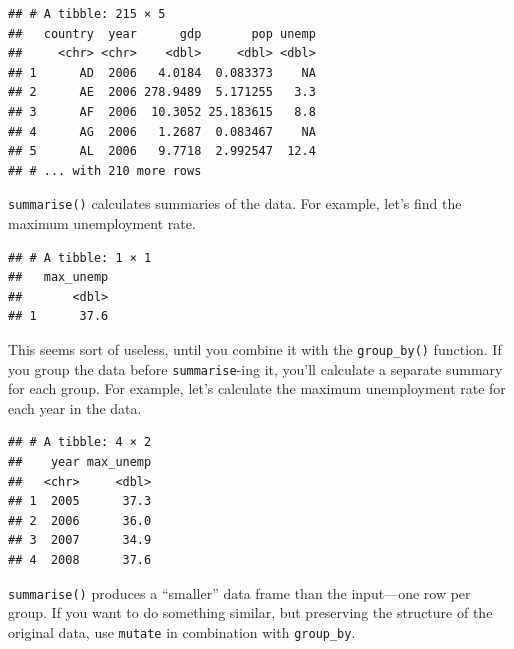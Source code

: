 \documentclass[12pt,oneside,openany]{book}
\newenvironment{Shaded}{\begin{snugshade}}{\end{snugshade}}
\newcommand{\KeywordTok}[1]{\textcolor[rgb]{0.13,0.29,0.53}{\textbf{{#1}}}}
\newcommand{\DataTypeTok}[1]{\textcolor[rgb]{0.13,0.29,0.53}{{#1}}}
\newcommand{\StringTok}[1]{\textcolor[rgb]{0.31,0.60,0.02}{{#1}}}
\newcommand{\OtherTok}[1]{\textcolor[rgb]{0.56,0.35,0.01}{{#1}}}
\newcommand{\NormalTok}[1]{{#1}}
\begin{document}
\begin{verbatim}
## # A tibble: 215 × 5
##   country  year      gdp       pop unemp
##     <chr> <chr>    <dbl>     <dbl> <dbl>
## 1      AD  2006   4.0184  0.083373    NA
## 2      AE  2006 278.9489  5.171255   3.3
## 3      AF  2006  10.3052 25.183615   8.8
## 4      AG  2006   1.2687  0.083467    NA
## 5      AL  2006   9.7718  2.992547  12.4
## # ... with 210 more rows
\end{verbatim}

\texttt{summarise()} calculates summaries of the data. For example,
let's find the maximum unemployment rate.

\begin{Shaded}
\end{Shaded}

\begin{verbatim}
## # A tibble: 1 × 1
##   max_unemp
##       <dbl>
## 1      37.6
\end{verbatim}

This seems sort of useless, until you combine it with the
\texttt{group\_by()} function. If you group the data before
\texttt{summarise}-ing it, you'll calculate a separate summary for each
group. For example, let's calculate the maximum unemployment rate for
each year in the data.

\begin{Shaded}
\end{Shaded}

\begin{verbatim}
## # A tibble: 4 × 2
##    year max_unemp
##   <chr>     <dbl>
## 1  2005      37.3
## 2  2006      36.0
## 3  2007      34.9
## 4  2008      37.6
\end{verbatim}

\texttt{summarise()} produces a ``smaller'' data frame than the
input---one row per group. If you want to do something similar, but
preserving the structure of the original data, use \texttt{mutate} in
combination with \texttt{group\_by}.
\end{document}
